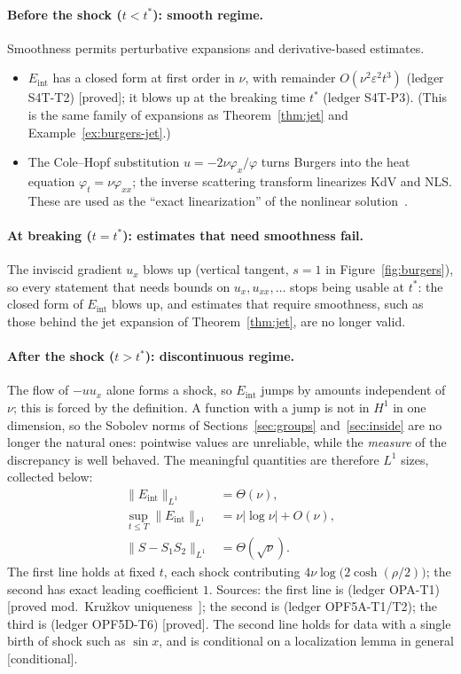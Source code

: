 \documentclass[11pt]{article}
\theoremstyle{plain}
\theoremstyle{definition}
\theoremstyle{remark}
\newcommand{\Eint}{E_{\mathrm{int}}}        %
\newcommand{\badge}[2]{\textcolor{#1}{\textsf{\footnotesize[#2]}}}
\newcommand{\proved}[1][]{\badge{cC}{proved#1}}
\newcommand{\modulo}[1]{\badge{cD}{proved mod.\ #1}}
\newcommand{\condl}{\badge{cD}{conditional}}
\newcommand{\led}[1]{\textcolor{cG}{\textsf{\footnotesize(ledger #1)}}}
\begin{document}
\paragraph{Before the shock ($t<t^*$): smooth regime.} Smoothness permits perturbative expansions and derivative-based estimates.
\begin{itemize}[nosep]
\item $\Eint$ has a closed form at first order in $\nu$, with remainder $O(\nu^2\varepsilon^2t^3)$ \led{S4T-T2} \proved; it blows up at the breaking time $t^*$ \led{S4T-P3}. (This is the same family of expansions as Theorem~\ref{thm:jet} and Example~\ref{ex:burgers-jet}.)
\item The Cole--Hopf substitution $u=-2\nu\varphi_x/\varphi$ turns Burgers into the heat equation $\varphi_t=\nu\varphi_{xx}$; the inverse scattering transform linearizes KdV and NLS. These are used as the ``exact linearization'' of the nonlinear solution~\cite{ch}.
\end{itemize}
\paragraph{At breaking ($t=t^*$): estimates that need smoothness fail.} The inviscid gradient $u_x$ blows up (vertical tangent, $s=1$ in Figure~\ref{fig:burgers}), so every statement that needs bounds on $u_x,u_{xx},\dots$ stops being usable at $t^*$: the closed form of $\Eint$ blows up, and estimates that require smoothness, such as those behind the jet expansion of Theorem~\ref{thm:jet}, are no longer valid.
\paragraph{After the shock ($t>t^*$): discontinuous regime.}
The flow of $-uu_x$ alone forms a shock, so $\Eint$ jumps by amounts independent of $\nu$; this is forced by the definition. A function with a jump is not in $H^1$ in one dimension, so the Sobolev norms of Sections~\ref{sec:groups} and~\ref{sec:inside} are no longer the natural ones: pointwise values are unreliable, while the \emph{measure} of the discrepancy is well behaved. The meaningful quantities are therefore $L^1$ sizes, collected below:
\begin{align}
\|\Eint\|_{L^1}&=\Theta(\nu),\\
\sup_{t\le T}\|\Eint\|_{L^1}&=\nu|\log\nu|+O(\nu),\\
\|S-S_1S_2\|_{L^1}&=\Theta(\sqrt\nu).
\end{align}
The first line holds at fixed $t$, each shock contributing $4\nu\log\!\big(2\cosh(\rho/2)\big)$; the second has exact leading coefficient $1$. Sources: the first line is \led{OPA-T1} \modulo{Kru\v zkov uniqueness~\cite{kr}}; the second is \led{OPF5A-T1/T2}; the third is \led{OPF5D-T6} \proved.
The second line holds for data with a single birth of shock such as $\sin x$, and is conditional on a localization lemma in general \condl{}.
\end{document}
